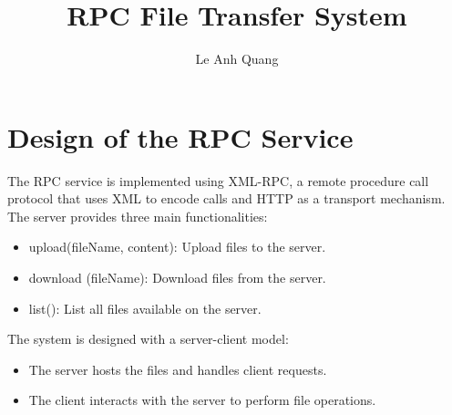 \documentclass{article}
\title{RPC File Transfer System}
\author{Le Anh Quang}
\date{}
\begin{document}
	
	\maketitle
	
	\section*{Design of the RPC Service}
	The RPC service is implemented using XML-RPC, a remote procedure call protocol that uses XML to encode calls and HTTP as a transport mechanism. The server provides three main functionalities:
	\begin{itemize}
		\item upload(fileName, content): Upload files to the server.
		\item download (fileName): Download files from the server.
		\item list(): List all files available on the server.
	\end{itemize}
	
	The system is designed with a server-client model:
	\begin{itemize}
		\item The server hosts the files and handles client requests.
		\item The client interacts with the server to perform file operations.
	\end{itemize}
	
\end{document}
